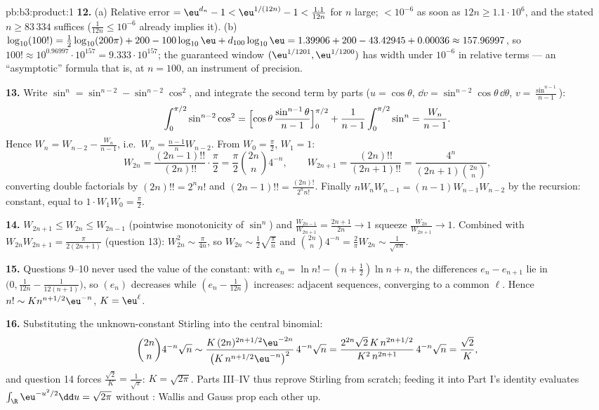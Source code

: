 \begin{solution}{pb:b3:product:1}
\textbf{12.} (a) Relative error $= \eu^{d_n} - 1 <
\eu^{1/(12n)} - 1 < \frac{1.1}{12n}$ for $n$ large; $<
10^{-6}$ as soon as $12n \geq 1.1\cdot10^6$, and the stated
$n \geq 83\,334$ suffices ($\frac1{12n} \leq 10^{-6}$
already implies it). (b) $\log_{10}(100!) =
\frac12\log_{10}(200\pi) + 200 - 100\log_{10}\eu +
d_{100}\log_{10}\eu = 1.39906 + 200 - 43.42945 + 0.00036
\approx 157.96997$, so $100! \approx 10^{0.96997} \cdot
10^{157} = 9.333\cdot10^{157}$; the guaranteed window
$(\eu^{1/1201}, \eu^{1/1200})$ has width under $10^{-6}$ in
relative terms --- an ``asymptotic'' formula that is, at $n =
100$, an instrument of precision.

\textbf{13.} Write $\sin^n = \sin^{n-2} - \sin^{n-2}\cos^2$,
and integrate the second term by parts ($u = \cos\theta$,
$\dd v = \sin^{n-2}\cos\theta\,\dd\theta$, $v =
\frac{\sin^{n-1}}{n-1}$):
\[
\int_0^{\pi/2}\sin^{n-2}\cos^2 =
\Bigl[\cos\theta\,\frac{\sin^{n-1}\theta}{n-1}\Bigr]_0^{\pi/2}
+ \frac1{n-1}\int_0^{\pi/2}\sin^n = \frac{W_n}{n-1} .
\]
Hence $W_n = W_{n-2} - \frac{W_n}{n-1}$, i.e.\ $W_n =
\frac{n-1}nW_{n-2}$. From $W_0 = \frac\pi2$, $W_1 = 1$:
\[
W_{2n} = \frac{(2n-1)!!}{(2n)!!}\cdot\frac\pi2
= \frac\pi2\binom{2n}n4^{-n},
\qquad
W_{2n+1} = \frac{(2n)!!}{(2n+1)!!}
= \frac{4^n}{(2n+1)\binom{2n}n},
\]
converting double factorials by $(2n)!! = 2^nn!$ and
$(2n-1)!! = \frac{(2n)!}{2^nn!}$. Finally $nW_nW_{n-1} =
(n-1)W_{n-1}W_{n-2}$ by the recursion: constant, equal to
$1\cdot W_1W_0 = \frac\pi2$.

\textbf{14.} $W_{2n+1} \leq W_{2n} \leq W_{2n-1}$ (pointwise
monotonicity of $\sin^n$) and $\frac{W_{2n-1}}{W_{2n+1}} =
\frac{2n+1}{2n} \to 1$ squeeze $\frac{W_{2n}}{W_{2n+1}} \to
1$. Combined with $W_{2n}W_{2n+1} = \frac{\pi}{2(2n+1)}$
(question 13): $W_{2n}^2 \sim \frac\pi{4n}$, so $W_{2n} \sim
\frac12\sqrt{\frac\pi n}$ and $\binom{2n}n4^{-n} =
\frac2\pi W_{2n} \sim \frac1{\sqrt{\pi n}}$.

\textbf{15.} Questions 9--10 never used the value of the
constant: with $e_n = \ln n! - (n+\frac12)\ln n + n$, the
differences $e_n - e_{n+1}$ lie in $\bigl(0, \frac1{12n} -
\frac1{12(n+1)}\bigr)$, so $(e_n)$ decreases while $(e_n -
\frac1{12n})$ increases: adjacent sequences, converging to a
common $\ell$. Hence $n! \sim K n^{n+1/2}\eu^{-n}$, $K =
\eu^\ell$.

\textbf{16.} Substituting the unknown-constant Stirling into
the central binomial:
\[
\binom{2n}n4^{-n}\sqrt n \sim
\frac{K\,(2n)^{2n+1/2}\eu^{-2n}}{\bigl(K\,n^{n+1/2}
\eu^{-n}\bigr)^2}\,4^{-n}\sqrt n
= \frac{2^{2n}\sqrt{2}\,K\,n^{2n+1/2}}{K^2\,n^{2n+1}}
\,4^{-n}\sqrt n = \frac{\sqrt2}{K},
\]
and question 14 forces $\frac{\sqrt2}K = \frac1{\sqrt\pi}$:
$K = \sqrt{2\pi}$. Parts III--IV thus reprove Stirling from
scratch; feeding it into Part I's identity evaluates
$\int_\R\eu^{-u^2/2}\dd u = \sqrt{2\pi}$ without : Wallis and Gauss prop each other up.


\end{solution}
